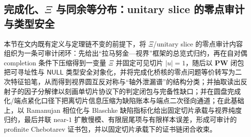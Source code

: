 \subsection{完成化、\texorpdfstring{$\Xi$}{Xi} 与同余等分布：unitary slice 的零点审计与类型安全}\label{subsec:xi-completion-audit}
本节在文内既有定义与定理链不变的前提下，将 \(\Xi\)/unitary slice 的零点审计内容组织为一条可审计闭环：先给出“拉马努金—视界”框架的总览式归约，再在自对偶 completion 条件下压缩得到一变量 \(\Xi\) 并固定可见切片 \(|u|=1\)，随后以 \(\mathbf{PW}\) 闭包把可寻址性与 \(\mathsf{NULL}\) 类型安全对象化，并将完成化桥核的零点问题等价转写为二次特征铅笔，从而得到视界圆互反对称与“轴外泄漏谱”的结构分类；并抽取读出反射子的因子分解律以刻画单切片协议下的判定闭包与完备性缺口；并在圆盘完成化/端点紧化口径下把离切片信息压缩为缺陷账本与端点二次径向通道；在此基础上，以 Ramanujan 相位化与 Blaschke 缺陷指标化给出固定切片承载与视界纯度归约，最后并联 near-\(1\) 扩散慢模、有限层尾项与有限样本误差，形成可审计的 profinite Chebotarev 证书包，并以固定切片承载下的证书链闭合收束。

